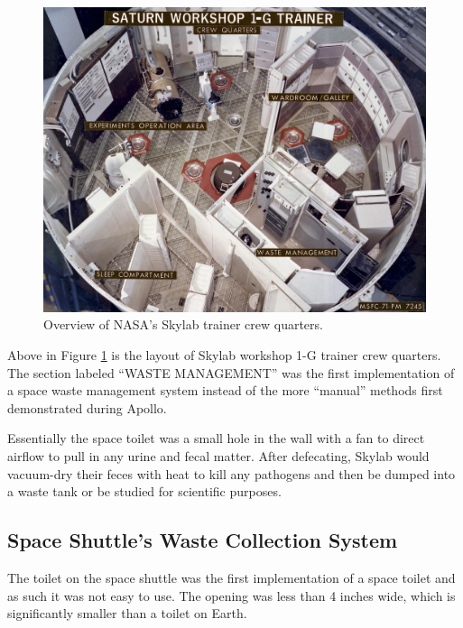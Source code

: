     \begin{figure}[h]
        \centering
        \includegraphics[width = \linewidth]{figs/skylab_overview.jpg}
        \caption[NASA's Skylab Crew Quarters]{Overview of NASA's Skylab trainer crew quarters.}
        \label{fig:skylab_overview}
    \end{figure}

    Above in Figure \ref{fig:skylab_overview} is the layout of Skylab workshop 1-G trainer crew quarters. The section labeled ``WASTE MANAGEMENT'' was the first implementation of a space waste management system instead of the more ``manual'' methods first demonstrated during Apollo.

    Essentially the space toilet was a small hole in the wall with a fan to direct airflow to pull in any urine and fecal matter. After defecating, Skylab would vacuum-dry their feces with heat to kill any pathogens and then be dumped into a waste tank or be studied for scientific purposes.\cite{ref:skylab_ref}

    \pagebreak
    \subsection{Space Shuttle's Waste Collection System}
    The toilet on the space shuttle was the first implementation of a space toilet and as such it was not easy to use. The opening was less than 4 inches wide, which is significantly smaller than a toilet on Earth. 

